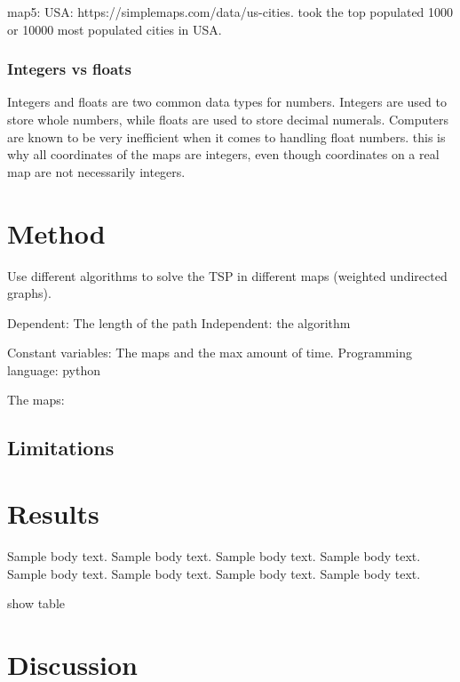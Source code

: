 \documentclass{article}
\begin{document}
map5: USA: https://simplemaps.com/data/us-cities. took the top populated 1000 or 10000 most populated cities in USA.

\subsubsection{Integers vs floats}\label{subsubsec1}
Integers and floats are two common data types for numbers. Integers are used to store whole numbers, while floats are used to store decimal numerals. Computers are known to be very inefficient when it comes to handling float numbers.
this is why all coordinates of the maps are integers, even though coordinates on a real map are not necessarily integers. 




\section{Method}\label{sec2}
Use different algorithms to solve the TSP in different maps (weighted undirected graphs).




Dependent: The length of the path
Independent: the algorithm


Constant variables: The maps and the max amount of time. Programming language: python

The maps: 

\subsection{Limitations}\label{subsec3}







\section{Results}\label{sec3}

Sample body text. Sample body text. Sample body text. Sample body text. Sample body text. Sample body text. Sample body text. Sample body text.

show table






\section{Discussion}\label{sec4}
\end{document}
